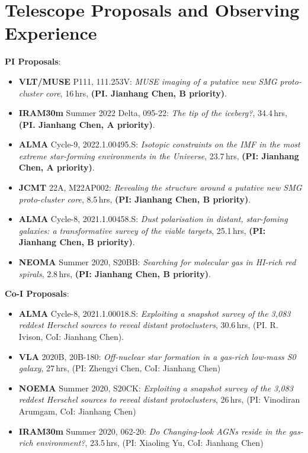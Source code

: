 \documentclass[A4,11pt]{article}
\newenvironment{paperlist}
{ \begin{itemize}[leftmargin=0.8cm, label={$\bullet$}]
    \setlength{\itemsep}{1pt}
    \setlength{\parskip}{1pt}
    \setlength{\parsep}{1pt}     }
{ \end{itemize}                  }
\begin{document}

\section{Telescope Proposals and Observing Experience}
{\bf PI Proposals}:\\
\vspace{-0.8em}
\begin{paperlist}
  \item {\bf VLT/MUSE} P111, 111.253V: \emph{MUSE imaging of a putative new SMG proto-cluster core}, 16\,hrs, {\bf (PI. Jianhang Chen, B priority)}.
  \item {\bf IRAM30m} Summer 2022 Delta, 095-22: \emph{The tip of the iceberg?}, 34.4\,hrs, {\bf (PI. Jianhang Chen, A priority)}.
    \item {\bf ALMA} Cycle-9, 2022.1.00495.S: \emph{Isotopic constraints on the IMF in the most extreme star-forming environments in the Universe}, 23.7\,hrs, {\bf (PI: Jianhang Chen, A priority)}. 
    \item {\bf JCMT} 22A, M22AP002: \emph{Revealing the structure around a putative new SMG proto-cluster core}, 8.5\,hrs, {\bf (PI: Jianhang Chen, B priority)}.
    \item {\bf ALMA} Cycle-8, 2021.1.00458.S: \emph{Dust polarisation in distant, star-foming galaxies: a transformative survey of the viable targets}, 25.1\,hrs, {\bf (PI: Jianhang Chen, B priority)}. 
    \item {\bf NEOMA} Summer 2020, S20BB: \emph{Searching for molecular gas in HI-rich red spirals}, 2.8\,hrs, {\bf (PI: Jianhang Chen, B priority)}. 
\end{paperlist}

{\bf Co-I Proposals}:\\
\vspace{-0.8em}
\begin{paperlist}
    \item {\bf ALMA} Cycle-8, 2021.1.00018.S: \emph{Exploiting a snapshot survey of the 3,083 reddest Herschel sources to reveal distant protoclusters}, 30.6\,hrs, (PI. R. Ivison, CoI: Jianhang Chen).
    \item {\bf VLA} 2020B, 20B-180: \emph{Off-nuclear star formation in a gas-rich low-mass S0 galaxy}, 27\,hrs, (PI: Zhengyi Chen, CoI: Jianhang Chen)
    \item {\bf NOEMA} Summer 2020, S20CK: \emph{Exploiting a snapshot survey of the 3,083 reddest Herschel sources to reveal distant protoclusters}, 26\,hrs, (PI: Vinodiran Arumgam, CoI: Jianhang Chen)
    \item {\bf IRAM30m} Summer 2020, 062-20: \emph{Do Changing-look AGNs reside in the gas-rich environment?}, 23.5\,hrs, (PI: Xiaoling Yu, CoI: Jianhang Chen)
\end{paperlist}
\end{document}
